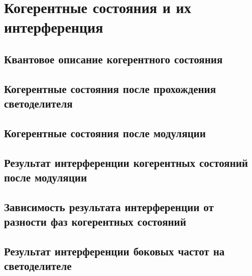 \chapter{Когерентные состояния и их интерференция}  \label{ch:ch4}
\section{Квантовое описание когерентного состояния} \label{sec:ch4/sec1}



\section{Когерентные состояния после прохождения светоделителя} \label{ch:ch4/sect2}



\section{Когерентные состояния после модуляции} \label{ch:ch4/sect3}



\section{Результат интерференции когерентных состояний после модуляции} \label{ch:ch4/sect4}



\section{Зависимость результата интерференции от разности фаз когерентных состояний} \label{ch:ch4/sect5}



\section{Результат интерференции боковых частот на светоделителе} \label{ch:ch4/sect6}




